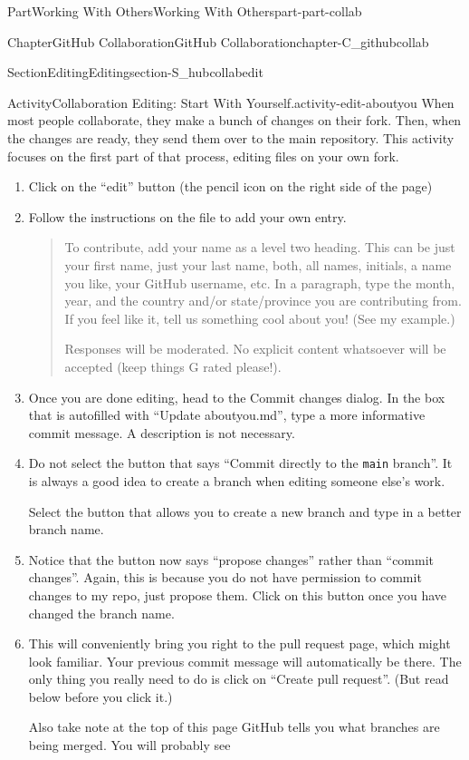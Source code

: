 \documentclass[oneside,10pt,]{book}
\newcommand{\mono}[1]{\texttt{#1}}
\begin{document}
\begin{partptx}{Part}{Working With Others}{}{Working With Others}{}{}{part-part-collab}
\begin{chapterptx}{Chapter}{GitHub Collaboration}{}{GitHub Collaboration}{}{}{chapter-C_githubcollab}
\begin{sectionptx}{Section}{Editing}{}{Editing}{}{}{section-S_hubcollabedit}
\begin{activity}{Activity}{Collaboration Editing: Start With Yourself.}{activity-edit-aboutyou}
When most people collaborate, they make a bunch of changes on their fork. Then, when the changes are ready, they send them over to the main repository. This activity focuses on the first part of that process, editing files on your own fork.%
\begin{enumerate}[font=\bfseries,label=(\alph*),ref=\alph*]%
\item{}Click on the ``edit'' button (the pencil icon on the right side of the page)%
\item{}Follow the instructions on the file to add your own entry.%
\begin{quote}%
To contribute, add your name as a level two heading. This can be just your first name, just your last name, both, all names, initials, a name you like, your GitHub username, etc. In a paragraph, type the month, year, and the country and\slash{}or state\slash{}province you are contributing from. If you feel like it, tell us something cool about you! (See my example.)%
\par
Responses will be moderated. No explicit content whatsoever will be accepted (keep things G rated please!).%
\end{quote}
\item{}Once you are done editing, head to the Commit changes dialog. In the box that is autofilled with ``Update aboutyou.md'', type a more informative commit message. A description is not necessary.%
\item{}Do not select the button that says ``Commit directly to the \mono{main} branch''. It is always a good idea to create a branch when editing someone else's work.%
\par
Select the button that allows you to create a new branch and type in a better branch name.%
\item{}Notice that the button now says ``propose changes'' rather than ``commit changes''. Again, this is because you do not have permission to commit changes to my repo, just propose them. Click on this button once you have changed the branch name.%
\item{}This will conveniently bring you right to the pull request page, which might look familiar. Your previous commit message will automatically be there. The only thing you really need to do is click on ``Create pull request''. (But read below before you click it.)%
\par
Also take note at the top of this page GitHub tells you what branches are being merged. You will probably see%
\begin{quote}%

\end{quote}
\end{enumerate}
\end{activity}
\end{sectionptx}
\end{chapterptx}
\end{partptx}
\end{document}
